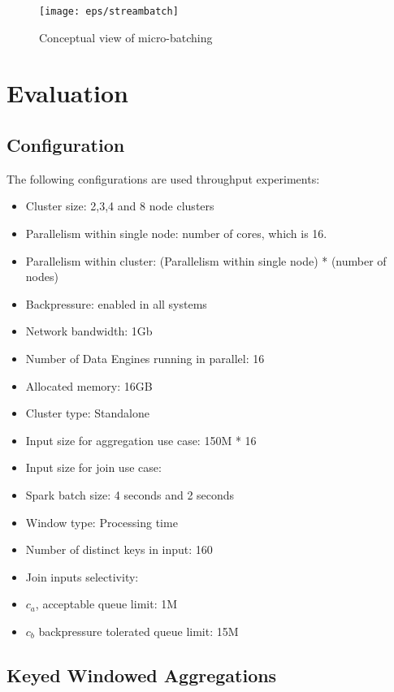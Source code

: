 \begin{figure}[h]
\centering
\texttt{[image: eps/streambatch]}
\caption{Conceptual view of micro-batching}
\label{fig_micro_batch}
\end{figure}







\section{Evaluation}
\label{eval}
\subsection{Configuration}
The following configurations are used throughput experiments:
\begin{itemize}
\item Cluster size: 2,3,4 and 8 node clusters
\item Parallelism within single node: number of cores, which is 16.
\item Parallelism within cluster: (Parallelism within single node) * (number of nodes)

\item Backpressure: enabled in all systems
\item Network bandwidth: 1Gb
\item Number of Data Engines running in parallel: 16
\item Allocated memory: 16GB
\item Cluster type: Standalone
\item Input size for aggregation use case: 150M * 16
\item Input size for join use case: 
\item Spark batch size: 4 seconds and 2 seconds
\item Window type: Processing time
\item Number of distinct keys in input: 160
\item Join inputs selectivity: 
\item $c_{a}$, acceptable queue limit: 1M
\item $c_{b}$ backpressure tolerated queue limit: 15M
\end{itemize}

\subsection{Keyed Windowed Aggregations}

